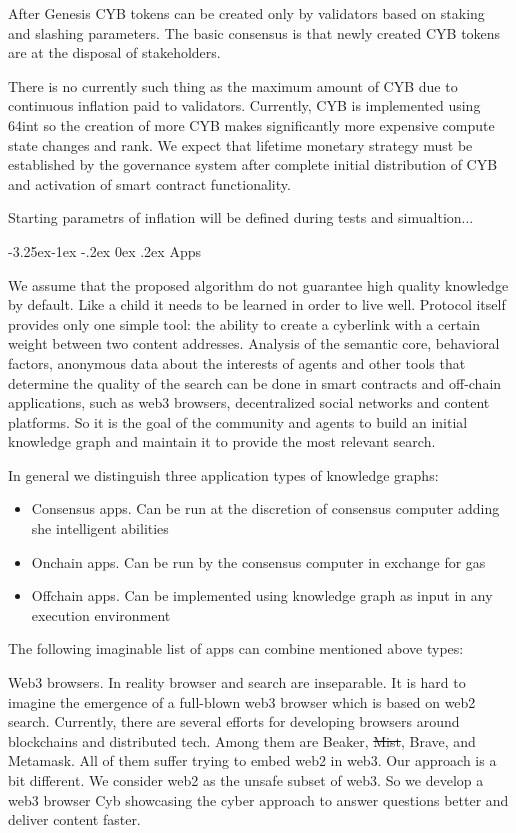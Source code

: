 \documentclass[8pt,oneside]{amsart}
\makeatletter
\renewcommand\subsection{\@startsection{subsection}{2}{\z@}%
                                     {-3.25ex\@plus -1ex \@minus -.2ex}%
                                     {0ex \@plus .2ex}%
                                     {\play\Large}}%
\newcommand{\titleSection}[1]{\subsection{#1}}
\newcommand{\code}[1]{{\PlayBold #1}}
\newenvironment{Figure}
  {\par\medskip\noindent\minipage{\linewidth}}
  {\endminipage\par\medskip}
\makeatother
\begin{document}
\begin{Figure}
 \centering
 
\end{Figure}

After Genesis CYB tokens can be created only by validators based on staking and slashing parameters. The basic consensus is that newly created CYB tokens are at the disposal of stakeholders.

There is no currently such thing as the maximum amount of CYB due to continuous inflation paid to validators. Currently, CYB is implemented using 64int so the creation of more CYB makes significantly more expensive compute state changes and rank. We expect that lifetime monetary strategy must be established by the governance system after complete initial distribution of CYB and activation of smart contract functionality.

Starting parametrs of inflation will be defined during tests and simualtion...

\titleSection{Apps}\label{apps}

We assume that the proposed algorithm do not guarantee high quality knowledge by default. Like a child it needs to be learned in order to live well. Protocol itself provides only one simple tool: the ability to create a cyberlink with a certain weight between two content addresses. Analysis of the semantic core, behavioral factors, anonymous data about the interests of agents and other tools that determine the quality of the search can be done in smart contracts and off-chain applications, such as web3 browsers, decentralized social networks and content platforms. So it is the goal of the community and agents to build an initial knowledge graph and maintain it to provide the most relevant search.

In general we distinguish three application types of knowledge graphs:
\begin{itemize}
\item Consensus apps. Can be run at the discretion of consensus computer adding she intelligent abilities
\item Onchain apps. Can be run by the consensus computer in exchange for gas
\item Offchain apps. Can be implemented using knowledge graph as input in any execution environment
\end{itemize}

The following imaginable list of apps can combine mentioned above types:

\code{Web3 browsers}. In reality browser and search are inseparable. It is hard to imagine the emergence of a full-blown web3 browser which is based on web2 search. Currently, there are several efforts for developing browsers around blockchains and distributed tech. Among them are Beaker, \sout{Mist}, Brave, and Metamask. All of them suffer trying to embed web2 in web3. Our approach is a bit different. We consider web2 as the unsafe subset of web3. So we develop a web3 browser Cyb showcasing the cyber approach to answer questions better and deliver content faster.
\end{document}
